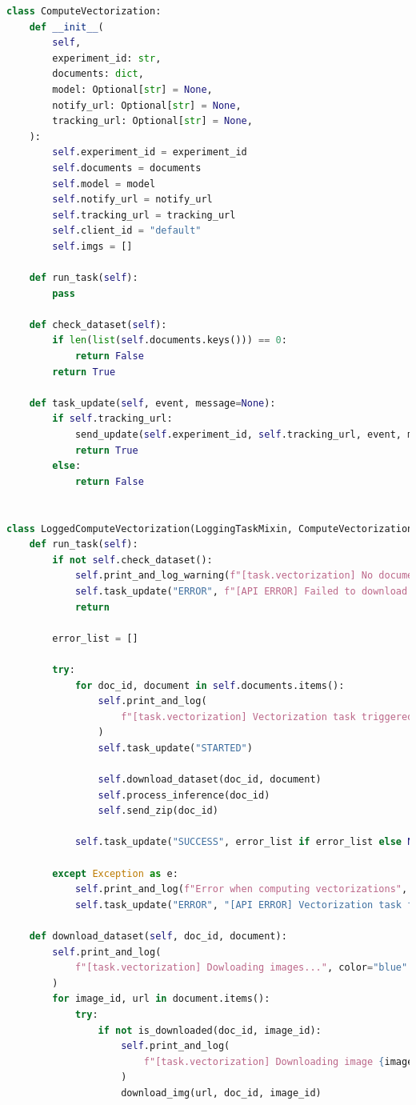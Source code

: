  \begin{lstlisting}[language=python, frame=single, breaklines=true, caption={Classe \texttt{ComputeVectorization}.}]
 class ComputeVectorization:
    def __init__(
        self,
        experiment_id: str,
        documents: dict,
        model: Optional[str] = None,
        notify_url: Optional[str] = None,
        tracking_url: Optional[str] = None,
    ):
        self.experiment_id = experiment_id
        self.documents = documents
        self.model = model
        self.notify_url = notify_url
        self.tracking_url = tracking_url
        self.client_id = "default"
        self.imgs = []

    def run_task(self):
        pass

    def check_dataset(self):
        if len(list(self.documents.keys())) == 0:
            return False
        return True

    def task_update(self, event, message=None):
        if self.tracking_url:
            send_update(self.experiment_id, self.tracking_url, event, message)
            return True
        else:
            return False


class LoggedComputeVectorization(LoggingTaskMixin, ComputeVectorization):
    def run_task(self):
        if not self.check_dataset():
            self.print_and_log_warning(f"[task.vectorization] No documents to download")
            self.task_update("ERROR", f"[API ERROR] Failed to download documents for vectorization")
            return

        error_list = []

        try:
            for doc_id, document in self.documents.items():
                self.print_and_log(
                    f"[task.vectorization] Vectorization task triggered for {doc_id} !"
                )
                self.task_update("STARTED")

                self.download_dataset(doc_id, document)
                self.process_inference(doc_id)
                self.send_zip(doc_id)

            self.task_update("SUCCESS", error_list if error_list else None)

        except Exception as e:
            self.print_and_log(f"Error when computing vectorizations", e=e)
            self.task_update("ERROR", "[API ERROR] Vectorization task failed")

    def download_dataset(self, doc_id, document):
        self.print_and_log(
            f"[task.vectorization] Dowloading images...", color="blue"
        )
        for image_id, url in document.items():
            try:
                if not is_downloaded(doc_id, image_id):
                    self.print_and_log(
                        f"[task.vectorization] Downloading image {image_id}"
                    )
                    download_img(url, doc_id, image_id)


\end{lstlisting}
